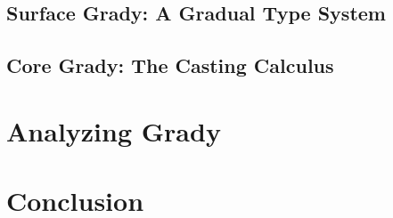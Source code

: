 \documentclass{llncs}
\begin{document}
\subsection{Surface Grady: A Gradual Type System}
\label{subsec:surface_grady:_a_gradual_type_system}


\subsection{Core Grady: The Casting Calculus}
\label{subsec:core_grady:_the_casting_calculus}


\section{Analyzing Grady}
\label{sec:results}


\section{Conclusion}
\label{sec:conclusion}






\appendix



\end{document}
